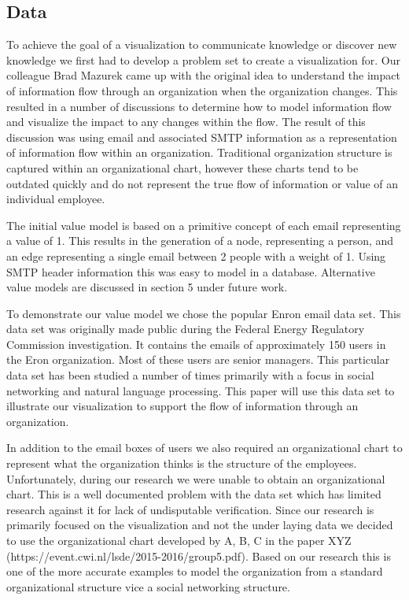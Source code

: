 \documentclass[journal]{vgtc}                %
\begin{document}
\subsection{Data}
To achieve the goal of a visualization to communicate knowledge or discover new knowledge we first had to develop a problem set to create a visualization for.  Our colleague Brad Mazurek came up with the original idea to understand the impact of information flow through an organization when the organization changes.  This resulted in a number of discussions to determine how to model information flow and visualize the impact to any changes within the flow.  The result of this discussion was using email and associated SMTP information as a representation of information flow within an organization.
Traditional organization structure is captured within an organizational chart, however these charts tend to be outdated quickly and do not represent the true flow of information or value of an individual employee.

The initial value model is based on a primitive concept of each email representing a value of 1.  This results in the generation of a node, representing a person, and an edge representing a single email between 2 people with a weight of 1.  Using SMTP header information this was easy to model in a database.  Alternative value models are discussed in section 5 under future work.

To demonstrate our value model we chose the popular Enron email data set.  This data set was originally made public during the Federal Energy Regulatory Commission investigation.  It contains the emails of approximately 150 users in the Eron organization.  Most of these users are senior managers.  This particular data set has been studied a number of times primarily with a focus in social networking and natural language processing.  This paper will use this data set to illustrate our visualization to support the flow of information through an organization.  

In addition to the email boxes of users we also required an organizational chart to represent what the organization thinks is the structure of the employees.  Unfortunately, during our research we were unable to obtain an organizational chart.  This is a well documented problem with the data set which has limited research against it for lack of undisputable verification.  Since our research is primarily focused on the visualization and not the under laying data we decided to use the organizational chart developed by A, B, C in the paper XYZ (https://event.cwi.nl/lsde/2015-2016/group5.pdf).  Based on our research this is one of the more accurate examples to model the organization from a standard organizational structure vice a social networking structure.
\end{document}
